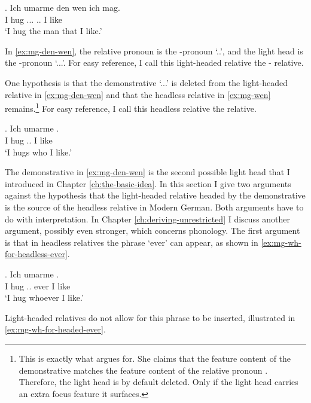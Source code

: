\exg. Ich umarme den wen ich mag.\\
I hug ... .. I like\\
`I hug the man that I like.'\label{ex:mg-den-wen}

In \ref{ex:mg-den-wen}, the relative pronoun is the -pronoun  `..', and the light head is the -pronoun  `...'. For easy reference, I call this light-headed relative the - relative.

One hypothesis is that the demonstrative  `...' is deleted from the light-headed relative in \ref{ex:mg-den-wen} and that the headless relative in \ref{ex:mg-wen} remains.\footnote{
This is exactly what \citet{hanink2018} argues for. She claims that the feature content of the demonstrative  matches the feature content of the relative pronoun . Therefore, the light head is by default deleted. Only if the light head carries an extra focus feature it surfaces.
}
For easy reference, I call this headless relative the  relative.

\exg. Ich umarme   .\\
I hug .. I like\\
`I hugs who I like.'\label{ex:mg-wen}

The demonstrative in \ref{ex:mg-den-wen} is the second possible light head that I introduced in Chapter \ref{ch:the-basic-idea}. In this section I give two arguments against the hypothesis that the light-headed relative headed by the demonstrative is the source of the headless relative in Modern German. Both arguments have to do with interpretation. In Chapter \ref{ch:deriving-unrestricted} I discuss another argument, possibly even stronger, which concerns phonology.
The first argument is that in headless relatives the phrase  `ever' can appear, as shown in \ref{ex:mg-wh-for-headless-ever}.

\exg. Ich umarme  { }  .\\
I hug .. ever I like\\
`I hug whoever I like.'\label{ex:mg-wh-for-headless-ever}

Light-headed relatives do not allow for this phrase to be inserted, illustrated in \ref{ex:mg-wh-for-headed-ever}.

